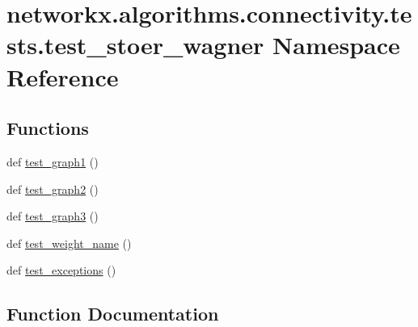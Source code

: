 \hypertarget{namespacenetworkx_1_1algorithms_1_1connectivity_1_1tests_1_1test__stoer__wagner}{}\section{networkx.\+algorithms.\+connectivity.\+tests.\+test\+\_\+stoer\+\_\+wagner Namespace Reference}
\label{namespacenetworkx_1_1algorithms_1_1connectivity_1_1tests_1_1test__stoer__wagner}
\subsection*{Functions}
\begin{DoxyCompactItemize}
\item 
def \hyperlink{namespacenetworkx_1_1algorithms_1_1connectivity_1_1tests_1_1test__stoer__wagner_a163f106e36ac74abae660d486a2a6811}{test\+\_\+graph1} ()
\item 
def \hyperlink{namespacenetworkx_1_1algorithms_1_1connectivity_1_1tests_1_1test__stoer__wagner_a430fceded208d36c815269726c4d4962}{test\+\_\+graph2} ()
\item 
def \hyperlink{namespacenetworkx_1_1algorithms_1_1connectivity_1_1tests_1_1test__stoer__wagner_a47d1d9abfc8f736f9332c405963836fe}{test\+\_\+graph3} ()
\item 
def \hyperlink{namespacenetworkx_1_1algorithms_1_1connectivity_1_1tests_1_1test__stoer__wagner_ac074e5208fe6f7183b96c10e26a6cf8e}{test\+\_\+weight\+\_\+name} ()
\item 
def \hyperlink{namespacenetworkx_1_1algorithms_1_1connectivity_1_1tests_1_1test__stoer__wagner_aa4d667d7651a5818816aa1b605c72002}{test\+\_\+exceptions} ()
\end{DoxyCompactItemize}


\subsection{Function Documentation}
\mbox{\label{namespacenetworkx_1_1algorithms_1_1connectivity_1_1tests_1_1test__stoer__wagner_aa4d667d7651a5818816aa1b605c72002}} 
